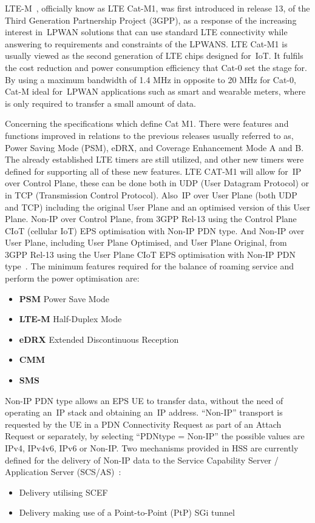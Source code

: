 
LTE-M~\cite{LTE-M}, officially know as LTE Cat-M1, was first introduced in release 13, of the Third Generation Partnership Project (3GPP), as a response of the increasing interest in~\gls{LPWAN} solutions that can use standard LTE connectivity while answering to requirements and constraints  of the LPWANS.
LTE Cat-M1 is usually  viewed as the second generation of LTE chips designed for~\gls{IoT}. It fulfils  the cost reduction and power consumption efficiency  that Cat-0 set the stage for. 
By using a  maximum bandwidth of 1.4 MHz in opposite to 20 MHz for Cat-0, Cat-M ideal for~\gls{LPWAN} applications such as  smart and wearable meters, where is only required to transfer a small amount of data.

Concerning the specifications  which define Cat M1. There were features and functions improved in relations to the previous releases usually referred to as, Power Saving Mode (PSM), eDRX, and  Coverage Enhancement Mode A and B. The already established LTE timers are still utilized, and other new timers were defined for supporting all of these new features.
LTE CAT-M1 will allow for~\gls{IP} over Control Plane, these can be done  both in UDP (User Datagram Protocol) or in  TCP (Transmission Control Protocol).
Also~\gls{IP} over User Plane (both UDP and TCP) including the original User Plane and an optimised version of this User Plane.
Non-IP over Control Plane, from 3GPP Rel-13 using the Control Plane CIoT (cellular IoT) EPS optimisation with Non-IP PDN type. 
And Non-IP over User Plane, including User Plane Optimised, and User Plane Original, from 3GPP Rel-13 using the User Plane CIoT EPS optimisation with Non-IP PDN type~\cite{LTE-M}. 
The  minimum features required for the balance of roaming service  and perform the power optimisation are:
\begin{itemize}
	\item \textbf{PSM } Power Save Mode
	\item \textbf{LTE-M} Half-Duplex Mode
	\item \textbf{eDRX } Extended Discontinuous Reception
	\item \textbf{CMM } 
	\item \textbf{SMS} 
\end{itemize} 

Non-IP PDN type allows an EPS UE to transfer data,  without the need of  operating an~\gls{IP} stack and obtaining an~\gls{IP} address. “Non-IP” transport is requested by the UE in a PDN Connectivity Request as part of an Attach Request or separately, by selecting “PDNtype = Non-IP” the possible values are IPv4, IPv4v6, IPv6 or Non-IP. Two mechanisms provided in HSS are currently defined for
the delivery of Non-IP data to the Service Capability Server / Application Server (SCS/AS)~\cite{LTE-M}:
\begin{itemize}
	\item Delivery utilising SCEF
	\item Delivery making use of  a Point-to-Point (PtP) SGi tunnel

\end{itemize} 

